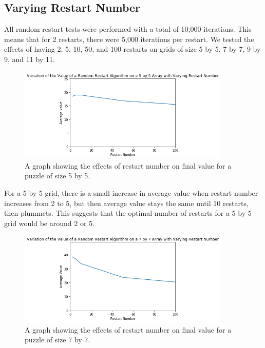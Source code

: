 \documentclass[12pt]{article}
\begin{document}
\subsection*{Varying Restart Number}

All random restart tests were performed with a total of 10,000 iterations. This means that for 2 restarts, there were 5,000 iterations per restart. We tested the effects of having 2, 5, 10, 50, and 100 restarts on grids of size 5 by 5, 7 by 7, 9 by 9, and 11 by 11.

\begin{figure}[H]
    \centering
    \includegraphics[width=0.9\textwidth]{random_restarts_5x5_restarts}
    \caption{A graph showing the effects of restart number on final value for a puzzle of size 5 by 5.}
    \label{fig:random_restarts_5x5_restarts}
\end{figure}

For a 5 by 5 grid, there is a small increase in average value when restart number increases from 2 to 5, but then average value stays the same until 10 restarts, then plummets. This suggests that the optimal number of restarts for a 5 by 5 grid would be around 2 or 5.

\begin{figure}[H]
    \centering
    \includegraphics[width=0.9\textwidth]{random_restarts_7x7_restarts}
    \caption{A graph showing the effects of restart number on final value for a puzzle of size 7 by 7.}
    \label{fig:random_restarts_7x7_restarts}
\end{figure}
\end{document}
